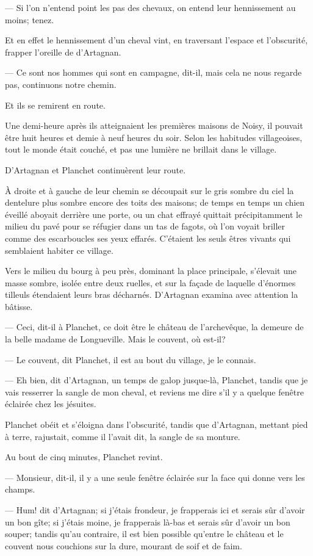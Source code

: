 — Si l'on n'entend point les pas des chevaux, on entend leur hennissement au moins; tenez.

Et en effet le hennissement d'un cheval vint, en traversant l'espace et l'obscurité, frapper l'oreille de d'Artagnan.

— Ce sont nos hommes qui sont en campagne, dit-il, mais cela ne nous regarde pas, continuons notre chemin.

Et ils se remirent en route.

Une demi-heure après ils atteignaient les premières maisons de Noisy, il pouvait être huit heures et demie à neuf heures du soir. Selon les habitudes villageoises, tout le monde était couché, et pas une lumière ne brillait dans le village.

D'Artagnan et Planchet continuèrent leur route.

À droite et à gauche de leur chemin se découpait sur le gris sombre du ciel la dentelure plus sombre encore des toits des maisons; de temps en temps un chien éveillé aboyait derrière une porte, ou un chat effrayé quittait précipitamment le milieu du pavé pour se réfugier dans un tas de fagots, où l'on voyait briller comme des escarboucles ses yeux effarés. C'étaient les seuls êtres vivants qui semblaient habiter ce village.

Vers le milieu du bourg à peu près, dominant la place principale, s'élevait une masse sombre, isolée entre deux ruelles, et sur la façade de laquelle d'énormes tilleuls étendaient leurs bras décharnés. D'Artagnan examina avec attention la bâtisse.

— Ceci, dit-il à Planchet, ce doit être le château de l'archevêque, la demeure de la belle madame de Longueville. Mais le couvent, où est-il?

— Le couvent, dit Planchet, il est au bout du village, je le connais.

— Eh bien, dit d'Artagnan, un temps de galop jusque-là, Planchet, tandis que je vais resserrer la sangle de mon cheval, et reviens me dire s'il y a quelque fenêtre éclairée chez les jésuites.

Planchet obéit et s'éloigna dans l'obscurité, tandis que d'Artagnan, mettant pied à terre, rajustait, comme il l'avait dit, la sangle de sa monture.

Au bout de cinq minutes, Planchet revint.

— Monsieur, dit-il, il y a une seule fenêtre éclairée sur la face qui donne vers les champs.

— Hum! dit d'Artagnan; si j'étais frondeur, je frapperais ici et serais sûr d'avoir un bon gîte; si j'étais moine, je frapperais là-bas et serais sûr d'avoir un bon souper; tandis qu'au contraire, il est bien possible qu'entre le château et le couvent nous couchions sur la dure, mourant de soif et de faim.

